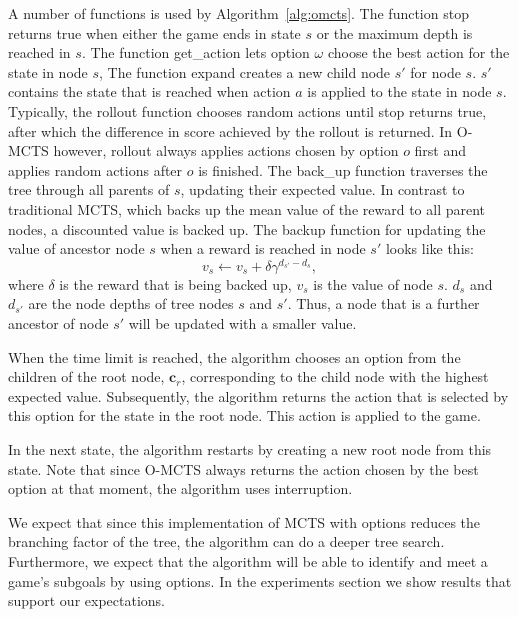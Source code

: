 A number of functions is used by Algorithm~\ref{alg:omcts}. The function
\textsf{stop} returns true when either the game ends in state $s$ or the maximum
depth is reached in $s$. The function \textsf{get\_action} lets option $\omega$
choose the best action for the state in node $s$, The function \textsf{expand}
creates a new child node $s'$ for node $s$. $s'$ contains the state that is
reached when action $a$ is applied to the state in node $s$. Typically, the
\textsf{rollout} function chooses random actions until \textsf{stop} returns
true, after which the difference in score achieved by the rollout is returned.
In O-MCTS however, \textsf{rollout} always applies actions chosen by option $o$
first and applies random actions after $o$ is finished. The \textsf{back\_up}
function traverses the tree through all parents of $s$, updating their expected
value. In contrast to traditional MCTS, which backs up the mean value of the
reward to all parent nodes, a discounted value is backed up. The backup function
for updating the value of ancestor node $s$ when a reward is reached in node $s'$
looks like this:
\begin{equation}
	\label{eq:backup}
	v_s \gets v_s + \delta\gamma^{d_{s'}-d_{s}},
\end{equation}
where $\delta$ is the reward that is being backed up, $v_s$ is the value of node
$s$. $d_s$ and $d_{s'}$ are the node depths of tree nodes $s$ and $s'$. Thus, a
node that is a further ancestor of node $s'$ will be updated with a smaller
value.

When the time limit is reached, the algorithm chooses an option from the
children of the root node, $\mathbf{c}_r$, corresponding to the child node with the
highest expected value. Subsequently, the algorithm returns the action that is
selected by this option for the state in the root node. This action is applied
to the game.

In the next state, the algorithm restarts by creating a new root node from
this state. Note that since O-MCTS always returns the action chosen by the best
option at that moment, the algorithm uses interruption.

We expect that since this implementation of MCTS with options reduces the
branching factor of the tree, the algorithm can do a deeper tree search.
Furthermore, we expect that the algorithm will be able to
identify and meet a game's subgoals by using options. In the experiments section
we show results that support our expectations.
